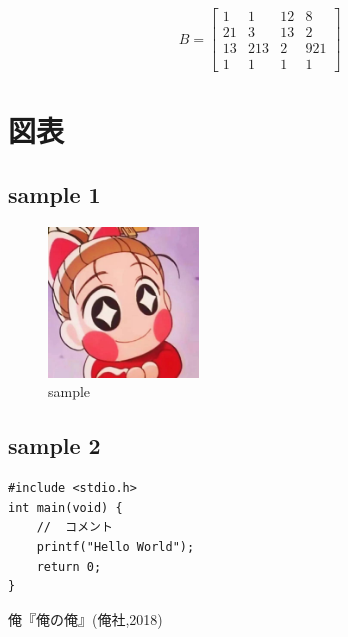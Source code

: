 \documentclass{jsarticle} %
\begin{document}
			\begin{equation*}
				B = 
				\begin{bmatrix}
					1&1&12&8 \\
					21&3&13&2 \\
					13&213&2&921 \\
					1&1&1&1
				\end{bmatrix}
			\end{equation*}

	\section{図表}
	\subsection{sample 1}
		\begin{figure}[H]
			\centering
			\includegraphics[width=4cm]{image-1.jpg}
			\caption{sample}
		\end{figure}

	\subsection{sample 2}
		\begin{lstlisting}[caption=キャプション,label=ラベル]
#include <stdio.h>
int main(void) {
	//	コメント
	printf("Hello World");
	return 0;
}
		\end{lstlisting}

	\begin{thebibliography}{9}
		 俺『俺の俺』(俺社,2018)
	\end{thebibliography}
\end{document}
